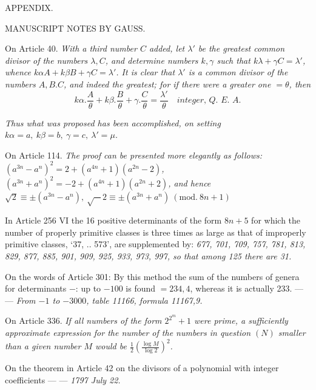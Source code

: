
\begin{center}APPENDIX.\end{center}

\begin{center}\small MANUSCRIPT NOTES BY GAUSS.\end{center}


On Article 40. \textit{With a third number \(C\) added, let \(\lambda'\) be the greatest common divisor of the numbers \(\lambda,C\), and determine numbers \(k,\gamma\) such that \(k\lambda+\gamma C=\lambda'\), whence \(k\alpha A+k\beta B+\gamma C=\lambda'\). It is clear that \(\lambda'\) is a common divisor of the numbers \(A,B.C\), and indeed the greatest; for if there were a greater one \(=\theta\), then \[k\alpha.\frac{A}{\theta}+k\beta.\frac{B}{\theta}+\gamma.\frac{C}{\theta}=\frac{\lambda'}{\theta}\quad\textit{integer, Q. E. A.}\]}


\textit{Thus what was proposed has been accomplished, on setting \(k\alpha=a,\ k\beta=b,\ \gamma=c,\ \lambda'=\mu\).}


On Article 114. \textit{The proof can be presented more elegantly as follows: \((a^{3n}-a^n)^2=2+(a^{4n}+1)(a^{2n}-2)\), \((a^{3n}+a^n)^2=-2+(a^{4n}+1)(a^{2n}+2)\), and hence \(\surd2\equiv\pm(a^{3n}-a^n),\ \surd-2\equiv\pm(a^{3n}+a^n)\ (\mathrm{mod.}\ 8n+1)\)}


In Article 256 VI the 16 positive determinants of the form \(8n+5\) for which the number of properly primitive classes is three times as large as that of improperly primitive classes, ‘37, .. 573’, are supplemented by: \textit{677, 701, 709, 757, 781, 813, 829, 877, 885, 901, 909, 925, 933, 973, 997, so that among 125 there are 31.}


On the words of Article 301: By this method the sum of the numbers of genera for determinants \(-\): up to \(-100\) is found \(=234,4\), whereas it is actually 233. — — \textit{From \(-1\) to \(-3000\), table 11166, formula 11167,9.}


On Article 336. \textit{If all numbers of the form \(2^{2^m}+1\) were prime, a sufficiently approximate expression for the number of the numbers in question \((N)\) smaller than a given number \(M\) would be \(\frac12\left(\frac{\log M}{\log2}\right)^2\).}


On the theorem in Article 42 on the divisors of a polynomial with integer coefficients — — \textit{1797 July 22.}


